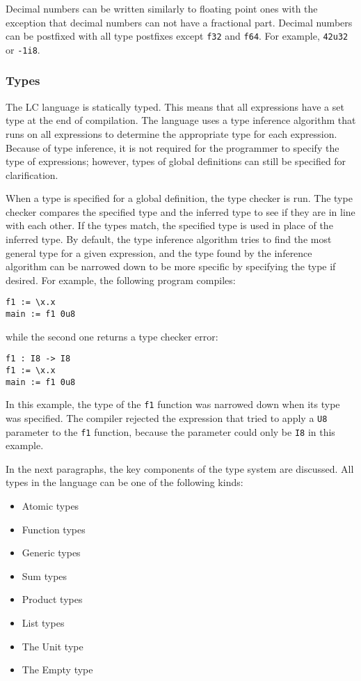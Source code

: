 \documentclass[12pt]{article}
\begin{document}
Decimal numbers can be written similarly to floating point ones with the
exception that decimal numbers can not have a fractional part. Decimal numbers
can be postfixed with all type postfixes except \verb$f32$ and \verb$f64$. For
example, \verb$42u32$ or \verb$-1i8$.

\subsubsection{Types}

The LC language is statically typed. This means that all expressions have a
set type at the end of compilation. The language uses a type inference algorithm
that runs on all expressions to determine the appropriate type for each
expression. Because of type inference, it is not required for the programmer to
specify the type of expressions; however, types of global definitions can still 
be specified for clarification.

When a type is specified for a global definition, the type checker is run. The
type checker compares the specified type and the inferred type to see if they
are in line with each other. If the types match, the specified type is used in
place of the inferred type. By default, the type inference algorithm tries to
find the most general type for a given expression, and the type found by the
inference algorithm can be narrowed down to be more specific by specifying the
type if desired. For example, the following program compiles:
\begin{lstlisting}
f1 := \x.x
main := f1 0u8
\end{lstlisting}
while the second one returns a type checker error:
\begin{lstlisting}
f1 : I8 -> I8
f1 := \x.x
main := f1 0u8
\end{lstlisting}
In this example, the type of the \verb$f1$ function was narrowed down when its
type was specified. The compiler rejected the expression that tried to apply a
\verb$U8$ parameter to the \verb$f1$ function, because the parameter could only
be \verb$I8$ in this example.

In the next paragraphs, the key components of the type system are discussed. All
types in the language can be one of the following kinds:
\begin{itemize}
    \item Atomic types
    \item Function types
    \item Generic types
    \item Sum types
    \item Product types
    \item List types
    \item The Unit type
    \item The Empty type
\end{itemize}
\end{document}
